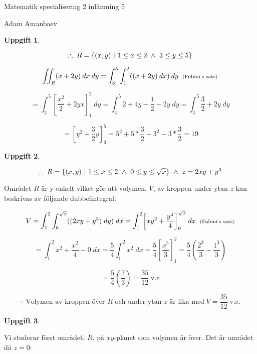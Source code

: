 \documentclass{article}
\newtheorem{thr}{Uppgift}
\begin{document}


\newpage

\centerline{\large Matematik specialisering 2 inlämning 5}

\vskip 0.1cm

\centerline{\scriptsize Adam Amanbaev}

\begin{thr}
\end{thr}

$$
\therefore\;
R=\{(x, y) \ | \  1\leq x\leq2 \ \wedge \  3\leq y\leq5\}
$$

$$
\iint_{R}(x+2y)\:dx\:dy
=
\int_{3}^{5}\int_{1}^{2}((x+2y)\:dx)\:dy
\;\;\text{\scriptsize (Fubini's sats)}
$$

$$
=
\int_{3}^{5}\left[\frac{x^2}{2}+2yx\right]_{1}^{2}\;dy
=
\int_{3}^{5}2+4y-\frac{1}{2}-2y\;dy
=
\int_{3}^{5}\frac{3}{2}+2y\;dy
$$

$$
=
\left[y^2+\frac{3}{2}y\right]_{3}^{5}
=
5^2+5*\frac{3}{2}-3^2-3*\frac{3}{2}
=
19 
$$

\newpage

\begin{thr}
\end{thr}

$$
\therefore\;
R=\{(x, y) \ | \  1\leq x\leq2 \ \wedge \  0\leq y \leq \sqrt{x}\} \ \wedge \  z=2xy+y^3
$$

\vskip 0.5cm

Området $R$ är y-enkelt vilket gör att volymen, $V$, av kroppen under ytan $z$ kan beskrivas av följande dubbelintegral:

$$
V=
\int_{1}^{2}\int_{0}^{\sqrt{x}}((2xy+y^3)\;dy)\;dx 
=
\int_{1}^{2}\left[xy^2+\frac{y^4}{4}\right]_{0}^{\sqrt{x}}\;dx\;\;\text{\scriptsize (Fubini's sats)}
$$

$$
=
\int_{1}^{2}x^2+\frac{x^2}{4}-0 \; dx
=
\frac{5}{4}\int_{1}^{2}x^2 \; dx
=
\frac{5}{4}\left[\frac{x^3}{3}\right]_{1}^{2}
=
\frac{5}{4}(\frac{2^3}{3}-\frac{1^3}{3})
$$

$$
=
\frac{5}{4}(\frac{7}{3})
=
\frac{35}{12} \; \text{v.e}
$$

$$
\therefore \; \text{Volymen av kroppen över $R$ och under ytan $z$ är lika med}\; V=\frac{35}{12} \;\text{v.e}.
$$

\newpage

\begin{thr}
\end{thr}

Vi studerar först området, $R$, på $xy$-planet som volymen är över. Det är området då $z=0$:
\end{document}
